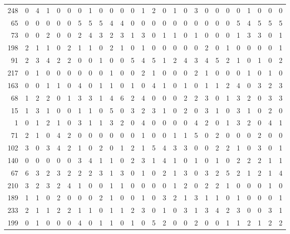 \begin{longtable}{@{\extracolsep{\fill}}rccccccccccccccccccccccccc@{}}
248 & 0 & 4 & 1 & 0 & 0 & 0 & 1 & 0 & 0 & 0 & 0 & 1 & 2 & 0 & 1 & 0 & 3 & 0 & 0 & 0 & 0 & 1 & 0 & 0 & 0 \\
65 & 0 & 0 & 0 & 0 & 0 & 5 & 5 & 5 & 4 & 4 & 0 & 0 & 0 & 0 & 0 & 0 & 0 & 0 & 0 & 0 & 5 & 4 & 5 & 5 & 5 \\
73 & 0 & 0 & 2 & 0 & 0 & 2 & 4 & 3 & 2 & 3 & 1 & 3 & 0 & 1 & 1 & 0 & 1 & 0 & 0 & 0 & 1 & 3 & 3 & 0 & 1 \\
198 & 2 & 1 & 1 & 0 & 2 & 1 & 1 & 0 & 2 & 1 & 0 & 1 & 0 & 0 & 0 & 0 & 0 & 2 & 0 & 1 & 0 & 0 & 0 & 0 & 1 \\
91 & 2 & 3 & 4 & 2 & 2 & 0 & 0 & 1 & 0 & 0 & 5 & 4 & 5 & 1 & 2 & 4 & 3 & 4 & 5 & 2 & 1 & 0 & 1 & 0 & 2 \\
217 & 0 & 1 & 0 & 0 & 0 & 0 & 0 & 0 & 1 & 0 & 0 & 2 & 1 & 0 & 0 & 0 & 2 & 1 & 0 & 0 & 0 & 1 & 0 & 1 & 0 \\
163 & 0 & 0 & 1 & 1 & 0 & 4 & 0 & 1 & 1 & 0 & 1 & 0 & 4 & 1 & 0 & 1 & 0 & 1 & 1 & 2 & 4 & 0 & 3 & 2 & 3 \\
68 & 1 & 2 & 2 & 0 & 1 & 3 & 3 & 1 & 4 & 6 & 2 & 4 & 0 & 0 & 0 & 2 & 2 & 3 & 0 & 1 & 3 & 2 & 0 & 3 & 3 \\
15 & 1 & 3 & 1 & 0 & 0 & 1 & 1 & 0 & 5 & 0 & 3 & 2 & 3 & 1 & 0 & 2 & 0 & 3 & 1 & 0 & 3 & 1 & 0 & 2 & 0 \\
1 & 0 & 1 & 2 & 1 & 0 & 3 & 1 & 1 & 3 & 2 & 0 & 4 & 0 & 0 & 0 & 0 & 4 & 2 & 0 & 1 & 3 & 2 & 0 & 4 & 1 \\
71 & 2 & 1 & 0 & 4 & 2 & 0 & 0 & 0 & 0 & 0 & 0 & 1 & 0 & 0 & 1 & 1 & 5 & 0 & 2 & 0 & 0 & 0 & 2 & 0 & 0 \\
102 & 3 & 0 & 3 & 4 & 2 & 1 & 0 & 2 & 0 & 1 & 2 & 1 & 5 & 4 & 3 & 3 & 0 & 0 & 2 & 2 & 1 & 0 & 3 & 0 & 1 \\
140 & 0 & 0 & 0 & 0 & 0 & 3 & 4 & 1 & 1 & 0 & 2 & 3 & 1 & 4 & 1 & 0 & 1 & 0 & 1 & 0 & 2 & 2 & 2 & 1 & 1 \\
67 & 6 & 3 & 2 & 3 & 2 & 2 & 2 & 3 & 1 & 3 & 0 & 1 & 0 & 2 & 1 & 3 & 0 & 3 & 2 & 5 & 2 & 1 & 2 & 1 & 4 \\
210 & 3 & 2 & 3 & 2 & 4 & 1 & 0 & 0 & 1 & 1 & 0 & 0 & 0 & 0 & 1 & 2 & 0 & 2 & 2 & 1 & 0 & 0 & 0 & 1 & 0 \\
189 & 1 & 1 & 0 & 2 & 0 & 0 & 0 & 2 & 1 & 0 & 0 & 1 & 0 & 3 & 2 & 1 & 3 & 1 & 1 & 0 & 1 & 0 & 0 & 0 & 1 \\
233 & 2 & 1 & 1 & 2 & 2 & 1 & 1 & 0 & 1 & 1 & 2 & 3 & 0 & 1 & 0 & 3 & 1 & 3 & 4 & 2 & 3 & 0 & 0 & 3 & 1 \\
199 & 0 & 1 & 0 & 0 & 0 & 4 & 0 & 1 & 1 & 0 & 1 & 0 & 5 & 2 & 0 & 0 & 2 & 0 & 0 & 1 & 1 & 2 & 1 & 2 & 2 \\

\end{longtable}
